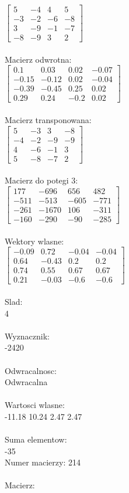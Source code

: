 \documentclass[a4paper,12pt]{article}
\begin{document}
$\begin{bmatrix} 5&-4&4&5\\-3&-2&-6&-8\\3&-9&-1&-7\\-8&-9&3&2 \end{bmatrix}$
\\
\\
Macierz odwrotna:\\

$\begin{bmatrix} 0.1&0.03&0.02&-0.07\\-0.15&-0.12&0.02&-0.04\\-0.39&-0.45&0.25&0.02\\0.29&0.24&-0.2&0.02 \end{bmatrix}$
\\
\\
Macierz transponowana:\\

$\begin{bmatrix} 5&-3&3&-8\\-4&-2&-9&-9\\4&-6&-1&3\\5&-8&-7&2 \end{bmatrix}$
\\
\\
Macierz do potegi 3:\\

$\begin{bmatrix} 177&-696&656&482\\-511&-513&-605&-771\\-261&-1670&106&-311\\-160&-290&-90&-285 \end{bmatrix}$
\\
\\
Wektory wlasne:\\

$\begin{bmatrix} -0.09&0.72&-0.04&-0.04\\0.64&-0.43&0.2&0.2\\0.74&0.55&0.67&0.67\\0.21&-0.03&-0.6&-0.6 \end{bmatrix}$
\\
\\
Slad:\\
4
\\
\\
Wyznacznik:\\
-2420
\\
\\
Odwracalnosc:\\
Odwracalna
\\
\\
Wartosci wlasne:\\
-11.18 10.24 2.47 2.47
\\
\\
Suma elementow:\\
-35
\\
\newpage
Numer macierzy:
214
\\
\\
Macierz:\\
\end{document}
